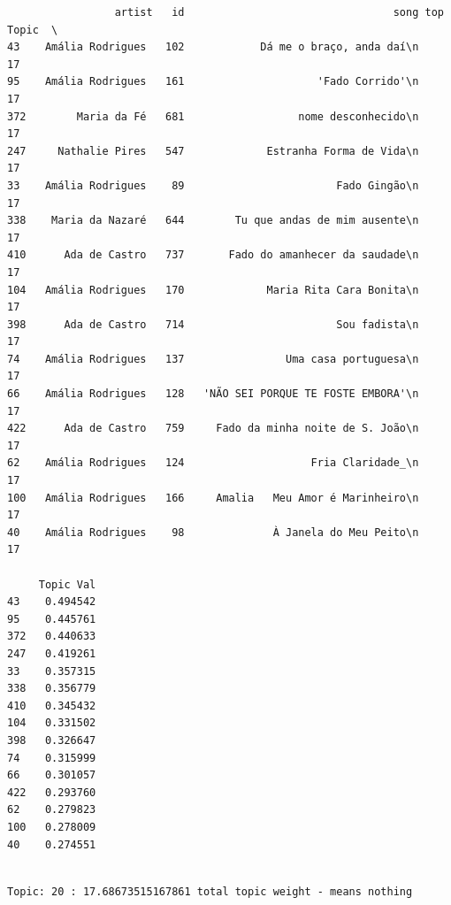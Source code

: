 \documentclass[11pt]{article}
\begin{document}
    
    \begin{verbatim}
                 artist   id                                 song top Topic  \
43    Amália Rodrigues   102            Dá me o braço, anda daí\n        17   
95    Amália Rodrigues   161                     'Fado Corrido'\n        17   
372        Maria da Fé   681                  nome desconhecido\n        17   
247     Nathalie Pires   547             Estranha Forma de Vida\n        17   
33    Amália Rodrigues    89                        Fado Gingão\n        17   
338    Maria da Nazaré   644        Tu que andas de mim ausente\n        17   
410      Ada de Castro   737       Fado do amanhecer da saudade\n        17   
104   Amália Rodrigues   170             Maria Rita Cara Bonita\n        17   
398      Ada de Castro   714                        Sou fadista\n        17   
74    Amália Rodrigues   137                Uma casa portuguesa\n        17   
66    Amália Rodrigues   128   'NÃO SEI PORQUE TE FOSTE EMBORA'\n        17   
422      Ada de Castro   759     Fado da minha noite de S. João\n        17   
62    Amália Rodrigues   124                    Fria Claridade_\n        17   
100   Amália Rodrigues   166     Amalia   Meu Amor é Marinheiro\n        17   
40    Amália Rodrigues    98              À Janela do Meu Peito\n        17   

     Topic Val  
43    0.494542  
95    0.445761  
372   0.440633  
247   0.419261  
33    0.357315  
338   0.356779  
410   0.345432  
104   0.331502  
398   0.326647  
74    0.315999  
66    0.301057  
422   0.293760  
62    0.279823  
100   0.278009  
40    0.274551  
    \end{verbatim}

    
    \begin{Verbatim}[commandchars=\\\{\}]

Topic: 20 : 17.68673515167861 total topic weight - means nothing

    \end{Verbatim}
\end{document}
